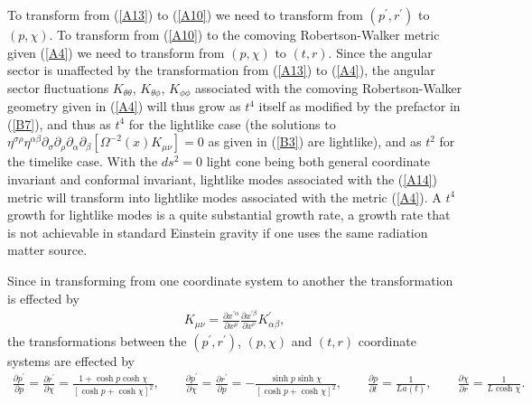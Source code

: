\documentclass[aps]{revtex4}
\begin{document}
To transform from (\ref{A13}) to (\ref{A10}) we need to transform from $(p^{\prime}, r^{\prime})$ to $(p,\chi)$. To transform from (\ref{A10}) to the comoving Robertson-Walker metric given (\ref{A4}) we need to transform from $(p,\chi)$ to $(t,r)$. Since the angular sector is unaffected by the transformation from (\ref{A13}) to (\ref{A4}), the angular sector fluctuations $K_{\theta\theta}$, $K_{\theta  \phi}$, $K_{\phi\phi}$ associated with the comoving Robertson-Walker geometry given in (\ref{A4}) will thus grow as $t^4$ itself as modified by the prefactor in (\ref{B7}), and thus as $t^4$ for the lightlike case (the solutions to $\eta^{\sigma\rho}\eta^{\alpha\beta}\partial_{\sigma}\partial_{\rho} \partial_{\alpha}\partial_{\beta}[\Omega^{-2}(x)K_{\mu\nu}]=0$ as given in  (\ref{B3}) are lightlike), and as $t^2$ for the timelike case. With the $ds^2=0$ light cone being both general coordinate invariant and conformal invariant, lightlike modes associated with the (\ref{A14}) metric will transform into lightlike modes associated with the metric (\ref{A4}). A $t^4$ growth for lightlike modes is a quite substantial growth rate, a growth rate that is not achievable in standard Einstein gravity if one uses the same radiation matter source. 

Since in transforming from one coordinate system to another the transformation is effected by 
%
\begin{eqnarray}
K_{\mu\nu}=\frac{\partial x^{\prime \alpha}}{\partial x^{\mu}}\frac{\partial x^{\prime\beta}}{\partial x^{\nu}}K^{\prime}_{\alpha\beta},
\label{B8}
\end{eqnarray}
%
the transformations between the $(p^{\prime}, r^{\prime})$, $(p,\chi)$ and $(t,r)$ coordinate systems are effected by
%
\begin{eqnarray}
\frac{\partial p^{\prime }}{\partial p}=\frac{\partial r^{\prime }}{\partial \chi}=\frac{1+\cosh p\cosh\chi}{[\cosh p+\cosh\chi]^2},\qquad
\frac{\partial p^{\prime }}{\partial \chi}=\frac{\partial r^{\prime }}{\partial p}=-\frac{\sinh p\sinh\chi}{[\cosh p+\cosh\chi]^2},\qquad \frac{\partial p}{\partial t}=\frac{1}{La(t)},\qquad \frac{\partial \chi}{\partial r}=\frac{1}{L\cosh\chi}.
\label{B9}
\end{eqnarray}
%
\end{document}

